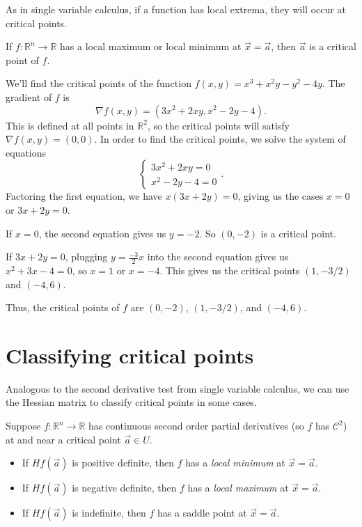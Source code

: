 \documentclass{ximera}
\begin{document}
As in single variable calculus, if a function has local extrema, they will occur at critical points.

\begin{proposition}
If $f:\mathbb{R}^n\rightarrow\mathbb{R}$ has a local maximum or local minimum at $\vec{x}=\vec{a}$, then $\vec{a}$ is a critical point of $f$.
\end{proposition}

\begin{example}
We'll find the critical points of the function $f(x,y) = x^3+x^2y-y^2-4y$. The gradient of $f$ is
\[
\nabla f(x,y) = (3x^2+2xy, x^2-2y-4).
\]
This is defined at all points in $\mathbb{R}^2$, so the critical points will satisfy $\nabla f(x,y)=(0,0)$. In order to find the critical points, we solve the system of equations
\[\begin{cases}
3x^2+2xy=0\\
x^2-2y-4=0
\end{cases}.\]
Factoring the first equation, we have $x(3x+2y)=0$, giving us the cases $x=0$ or $3x+2y=0$.

If $x=0$, the second equation gives us $y=-2$. So $(0,-2)$ is a critical point.

If $3x+2y=0$, plugging $y=\frac{-3}{2} x$ into the second equation gives us $x^2+3x-4=0$, so $x=1$ or $x=-4$. This gives us the critical points $(1,-3/2)$ and $(-4,6)$.

Thus, the critical points of $f$ are $(0,-2)$, $(1,-3/2)$, and $(-4,6)$.
\end{example}

\section*{Classifying critical points}

Analogous to the second derivative test from single variable calculus, we can use the Hessian matrix to classify critical points in some cases.

\begin{proposition}
Suppose $f:\mathbb{R}^n\rightarrow\mathbb{R}$ has continuous second order partial derivatives (so $f$ has $\mathcal{C}^2$) at and near a critical point $\vec{a}\in U$.
\begin{itemize}
\item If $Hf(\vec{a})$ is positive definite, then $f$ has a \emph{local minimum} at $\vec{x}=\vec{a}$.
\item If $Hf(\vec{a})$ is negative definite, then $f$ has a \emph{local maximum} at $\vec{x}=\vec{a}$.
\item If $Hf(\vec{a})$ is indefinite, then $f$ has a saddle point at $\vec{x}=\vec{a}$.
\end{itemize}
\end{proposition}
\end{document}
